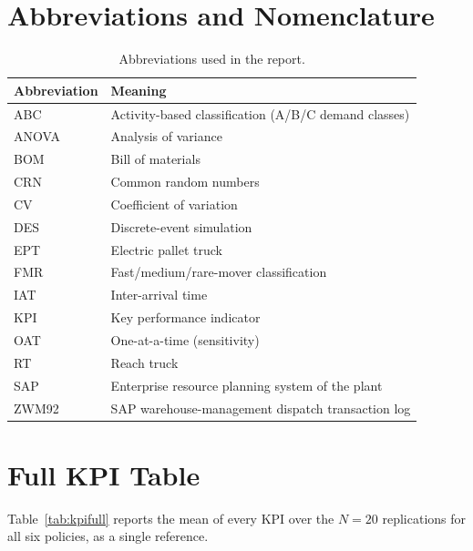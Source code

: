 \documentclass[conference]{IEEEtran}
\begin{document}
\section{Abbreviations and Nomenclature}
\begin{table}[htbp]
\centering
\caption{Abbreviations used in the report.}
\label{tab:abbrev}
\begin{tabular}{ll}
\toprule
Abbreviation & Meaning \\
\midrule
ABC & Activity-based classification (A/B/C demand classes) \\
ANOVA & Analysis of variance \\
BOM & Bill of materials \\
CRN & Common random numbers \\
CV & Coefficient of variation \\
DES & Discrete-event simulation \\
EPT & Electric pallet truck \\
FMR & Fast/medium/rare-mover classification \\
IAT & Inter-arrival time \\
KPI & Key performance indicator \\
OAT & One-at-a-time (sensitivity) \\
RT & Reach truck \\
SAP & Enterprise resource planning system of the plant \\
ZWM92 & SAP warehouse-management dispatch transaction log \\
\bottomrule
\end{tabular}
\end{table}

\section{Full KPI Table}
Table~\ref{tab:kpifull} reports the mean of every KPI over the $N=20$
replications for all six policies, as a single reference.
\end{document}
